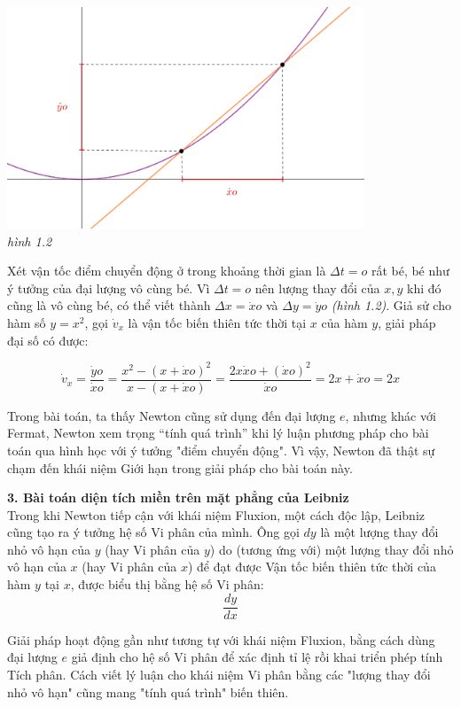 \documentclass[a4paper,12pt]{article}
\begin{document}
\begin{center}
	\includegraphics[width=0.8\textwidth]{newton}\\
	\textit{hình 1.2}
\end{center}
 
Xét vận tốc điểm chuyển động ở trong khoảng thời gian là $\Delta t=o$ rất bé, bé như ý tưởng của đại lượng vô cùng bé. Vì $\Delta t=o$ nên lượng thay đổi của $x, y$ khi đó cũng là vô cùng bé, có thể viết thành $\Delta x=\dot{x}o$ và $\Delta y=\dot{y}o$ \textit{(hình 1.2)}. Giả sử cho hàm số $y=x^2$, gọi $\dot{v}_x$ là vận tốc biến thiên tức thời tại $x$ của hàm $y$, giải pháp đại số có được:

$$\dot{v}_x=\frac{\dot{y}o}{\dot{x}o}=\frac{x^2-(x+\dot{x}o)^2}{x-(x+\dot{x}o)}=\frac{2x\dot{x}o+(\dot{x}o)^2}{\dot{x}o}=2x+\dot{x}o=2x$$

Trong bài toán, ta thấy Newton cũng sử dụng đến đại lượng $e$, nhưng khác với Fermat, Newton xem trọng “tính quá trình” khi lý luận phương pháp cho bài toán qua hình học với ý tưởng "điểm chuyển động". Vì vậy, Newton đã thật sự chạm đến khái niệm Giới hạn trong giải pháp cho bài toán này.\\
\newline

\textbf{3. Bài toán diện tích miền trên mặt phẳng của Leibniz}\\

Trong khi Newton tiếp cận với khái niệm Fluxion, một cách độc lập, Leibniz cũng tạo ra ý tưởng hệ số Vi phân của mình. Ông gọi $dy$ là một lượng thay đổi nhỏ vô hạn của $y$ (hay Vi phân của $y$) do (tương ứng với) một lượng thay đổi nhỏ vô hạn của $x$ (hay Vi phân của $x$) để đạt được Vận tốc biến thiên tức thời của hàm $y$ tại $x$, được biểu thị bằng hệ số Vi phân: $$\frac{dy}{dx}$$

Giải pháp hoạt động gần như tương tự với khái niệm Fluxion, bằng cách dùng đại lượng $e$ giả định cho hệ số Vi phân để xác định tỉ lệ rồi khai triển phép tính Tích phân. Cách viết lý luận cho khái niệm Vi phân bằng các "lượng thay đổi nhỏ vô hạn" cũng mang "tính quá trình" biến thiên.\\
\end{document}
